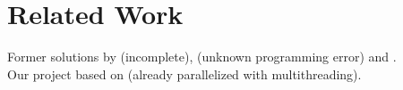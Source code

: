 
\section{Related Work}\label{sec:related_work}

 Former solutions by \cite{langer} (incomplete), \cite{szlichta:discovery} (unknown programming error) and \cite{consonni}. \\
 Our project based on \cite{consonni} (already parallelized with multithreading).
